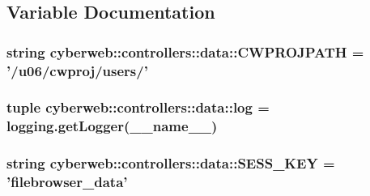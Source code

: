 \subsection{\-Variable \-Documentation}
\hypertarget{namespacecyberweb_1_1controllers_1_1data_af3070d06c83f5f8d6b5e67e0548efcd0}{
\subsubsection[{\-C\-W\-P\-R\-O\-J\-P\-A\-T\-H}]{\setlength{\rightskip}{0pt plus 5cm}string {\bf cyberweb\-::controllers\-::data\-::\-C\-W\-P\-R\-O\-J\-P\-A\-T\-H} = '/u06/cwproj/users/'}}\label{namespacecyberweb_1_1controllers_1_1data_af3070d06c83f5f8d6b5e67e0548efcd0}
\hypertarget{namespacecyberweb_1_1controllers_1_1data_af605a1c450275d4d286e5adcea0bc341}{
\subsubsection[{log}]{\setlength{\rightskip}{0pt plus 5cm}tuple {\bf cyberweb\-::controllers\-::data\-::log} = logging.\-get\-Logger(\-\_\-\-\_\-name\-\_\-\-\_\-)}}\label{namespacecyberweb_1_1controllers_1_1data_af605a1c450275d4d286e5adcea0bc341}
\hypertarget{namespacecyberweb_1_1controllers_1_1data_aa83a58bebb6549fbb7ab18c44eb5f91b}{
\subsubsection[{\-S\-E\-S\-S\-\_\-\-K\-E\-Y}]{\setlength{\rightskip}{0pt plus 5cm}string {\bf cyberweb\-::controllers\-::data\-::\-S\-E\-S\-S\-\_\-\-K\-E\-Y} = 'filebrowser\-\_\-data'}}\label{namespacecyberweb_1_1controllers_1_1data_aa83a58bebb6549fbb7ab18c44eb5f91b}
